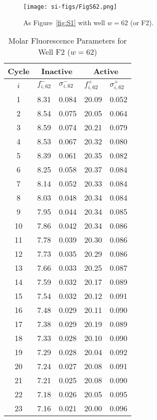                \begin{figure}
                    \centering
                    \texttt{[image: si-figs/FigS62.png]}
                    \caption{
                        As Figure~\ref{fig:S1} with well $w=62$ (or F2).
                    }
                \end{figure}
                \clearpage
    \begin{table}
        \caption{Molar Fluorescence Parameters for Well F2 ($w=62$)}
        \centering
        \begin{tabular}{c|ll|ll}
            Cycle & \multicolumn{2}{c|}{Inactive} & \multicolumn{2}{c}{Active} \\
            \hline
            $i$ & $f_{i,62}^{-}$ & $\sigma_{i,62}^{-}$ &  $f_{i,62}^{+}$ & $\sigma_{i,62}^{+}$ \\
            \hline
    1 & 8.31 & 0.084 & 20.09 & 0.052 \\
2 & 8.54 & 0.075 & 20.05 & 0.064 \\
3 & 8.59 & 0.074 & 20.21 & 0.079 \\
4 & 8.53 & 0.067 & 20.32 & 0.080 \\
5 & 8.39 & 0.061 & 20.35 & 0.082 \\
6 & 8.25 & 0.058 & 20.37 & 0.084 \\
7 & 8.14 & 0.052 & 20.33 & 0.084 \\
8 & 8.03 & 0.048 & 20.34 & 0.084 \\
9 & 7.95 & 0.044 & 20.34 & 0.085 \\
10 & 7.86 & 0.042 & 20.34 & 0.086 \\
11 & 7.78 & 0.039 & 20.30 & 0.086 \\
12 & 7.73 & 0.035 & 20.29 & 0.086 \\
13 & 7.66 & 0.033 & 20.25 & 0.087 \\
14 & 7.59 & 0.032 & 20.17 & 0.089 \\
15 & 7.54 & 0.032 & 20.12 & 0.091 \\
16 & 7.48 & 0.029 & 20.11 & 0.090 \\
17 & 7.38 & 0.029 & 20.19 & 0.089 \\
18 & 7.33 & 0.028 & 20.10 & 0.090 \\
19 & 7.29 & 0.028 & 20.04 & 0.092 \\
20 & 7.24 & 0.027 & 20.08 & 0.091 \\
21 & 7.21 & 0.025 & 20.08 & 0.090 \\
22 & 7.18 & 0.026 & 20.05 & 0.095 \\
23 & 7.16 & 0.021 & 20.00 & 0.096 \\

\end{tabular}
\end{table}
